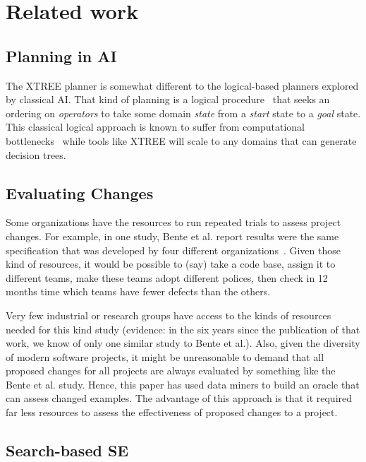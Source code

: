 \documentclass{sig-alternate}
\begin{document}
\section{Related work}

\subsection{Planning in AI}

The XTREE planner is somewhat different to the logical-based planners explored by 
classical AI. 
That kind of planning is a logical procedure~\cite{Fikes1971}
that seeks an ordering on {\em operators} to take some domain
{\em state} from a {\em start} state to a {\em  goal} state.
This classical logical approach is known to suffer from
computational bottlenecks~\cite{Bylander1994} while tools like XTREE will scale to any domains
that can generate decision trees.
  
\subsection{Evaluating Changes}

Some organizations have the resources to 
run repeated trials to assess  project changes.
For example, in one   study, Bente et al. report results
were the same  specification that was developed  by four different organizations~\cite{Anda2009}. Given those kind of resources, it would be possible
to (say) take a code base, assign it to different teams, make these teams  adopt different polices,
then check in 12 months time
 which teams have fewer defects than the others.  
 

Very few industrial or research groups have access
to the kinds of resources needed for this kind study  (evidence: in the six years since the
publication of that work, we know of only one   similar study to Bente et al.). Also, given the
diversity of modern software projects, it might be unreasonable to demand that all
proposed changes for all projects are always evaluated by something like the Bente et al. study.
Hence, 
this paper has used data miners to build an oracle that can assess changed examples. The advantage
of this approach is that it required far less resources to assess the effectiveness of proposed
changes to a project.  

\subsection{Search-based SE}
\end{document}
